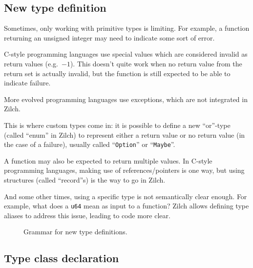\subsection{New type definition}\label{subsec:zilch-grammar-declarations-type}

Sometimes, only working with primitive types is limiting.
For example, a function returning an unsigned integer may need to indicate some sort of error.

\noindent C-style programming languages use special values which are considered invalid as return values (e.g.\ $-1$).
This doesn't quite work when no return value from the return set is actually invalid, but the function is still expected to be able to indicate failure.

\noindent More evolved programming languages use exceptions, which are not integrated in Zilch.

\noindent This is where custom types come in: it is possible to define a new ``or''-type (called ``enum'' in Zilch) to represent either a return value or no return value (in the case of a failure), usually called ``\texttt{Option}'' or ``\texttt{Maybe}''.

A function may also be expected to return multiple values.
In C-style programming languages, making use of references/pointers is one way, but using structures (called ``record''s) is the way to go in Zilch.

And some other times, using a specific type is not semantically clear enough.
For example, what does a \texttt{u64} mean as input to a function?
Zilch allows defining type aliases to address this issue, leading to code more clear.

\begin{figure}[H]
  \centering


  \caption{Grammar for new type definitions.}
  \label{fig:zilch-grammar-declarations-type-grammar}
\end{figure}

\subsection{Type class declaration}\label{subsec:zilch-grammar-declarations-typeclass}

